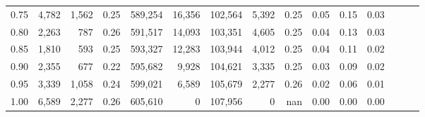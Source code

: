 \begin{tabular}{rrrrrrrrrrrrrrr}
0.75 &   4,782 &   1,562 &  0.25 &  589,254 &   16,356 &  102,564 &    5,392 &  0.25 &  0.05 &  0.15 &      0.03 \\
0.80 &   2,263 &     787 &  0.26 &  591,517 &   14,093 &  103,351 &    4,605 &  0.25 &  0.04 &  0.13 &      0.03 \\
0.85 &   1,810 &     593 &  0.25 &  593,327 &   12,283 &  103,944 &    4,012 &  0.25 &  0.04 &  0.11 &      0.02 \\
0.90 &   2,355 &     677 &  0.22 &  595,682 &    9,928 &  104,621 &    3,335 &  0.25 &  0.03 &  0.09 &      0.02 \\
0.95 &   3,339 &   1,058 &  0.24 &  599,021 &    6,589 &  105,679 &    2,277 &  0.26 &  0.02 &  0.06 &      0.01 \\
1.00 &   6,589 &   2,277 &  0.26 &  605,610 &        0 &  107,956 &        0 &   nan &  0.00 &  0.00 &      0.00 \\
\bottomrule
\end{tabular}
